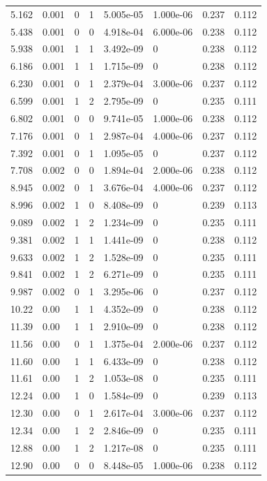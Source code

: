 \documentclass[preview]{standalone}
\begin{document}
{{\begin{tabular}{L{1.2cm}C{1.2cm} C{0.3cm}C{0.5cm} C{1.4cm}C{1.4cm} C{1.4cm}C{1.4cm}}
  5.162  &  0.001  & 0     &  1 &  5.005e-05  & 1.000e-06  & 0.237 &  0.112   \\ 
  5.438  &  0.001  & 0     &  0 &  4.918e-04  & 6.000e-06  & 0.238 &  0.112   \\ 
  5.938  &  0.001  & 1     &  1 &  3.492e-09  & 0  & 0.238 &  0.112   \\ 
  6.186  &  0.001  & 1     &  1 &  1.715e-09  & 0  & 0.238 &  0.112   \\ 
  6.230  &  0.001  & 0     &  1 &  2.379e-04  & 3.000e-06  & 0.237 &  0.112   \\ 
  6.599  &  0.001  & 1     &  2 &  2.795e-09  & 0  & 0.235 &  0.111   \\ 
  6.802  &  0.001  & 0     &  0 &  9.741e-05  & 1.000e-06  & 0.238 &  0.112   \\ 
  7.176  &  0.001  & 0     &  1 &  2.987e-04  & 4.000e-06  & 0.237 &  0.112   \\ 
  7.392  &  0.001  & 0     &  1 &  1.095e-05  & 0  & 0.237 &  0.112   \\ 
  7.708  &  0.002  & 0     &  0 &  1.894e-04  & 2.000e-06  & 0.238 &  0.112   \\ 
  8.945  &  0.002  & 0     &  1 &  3.676e-04  & 4.000e-06  & 0.237 &  0.112   \\ 
  8.996  &  0.002  & 1     &  0 &  8.408e-09  & 0  & 0.239 &  0.113   \\ 
  9.089  &  0.002  & 1     &  2 &  1.234e-09  & 0  & 0.235 &  0.111   \\ 
  9.381  &  0.002  & 1     &  1 &  1.441e-09  & 0  & 0.238 &  0.112   \\ 
  9.633  &  0.002  & 1     &  2 &  1.528e-09  & 0  & 0.235 &  0.111   \\ 
  9.841  &  0.002  & 1     &  2 &  6.271e-09  & 0  & 0.235 &  0.111   \\ 
  9.987  &  0.002  & 0     &  1 &  3.295e-06  & 0  & 0.237 &  0.112   \\ 
  10.22  &  0.00  & 1     &  1 &  4.352e-09  & 0  & 0.238 &  0.112   \\ 
  11.39  &  0.00  & 1     &  1 &  2.910e-09  & 0  & 0.238 &  0.112   \\ 
  11.56  &  0.00  & 0     &  1 &  1.375e-04  & 2.000e-06  & 0.237 &  0.112   \\ 
  11.60  &  0.00  & 1     &  1 &  6.433e-09  & 0  & 0.238 &  0.112   \\ 
  11.61  &  0.00  & 1     &  2 &  1.053e-08  & 0  & 0.235 &  0.111   \\ 
  12.24  &  0.00  & 1     &  0 &  1.584e-09  & 0  & 0.239 &  0.113   \\ 
  12.30  &  0.00  & 0     &  1 &  2.617e-04  & 3.000e-06  & 0.237 &  0.112   \\ 
  12.34  &  0.00  & 1     &  2 &  2.846e-09  & 0  & 0.235 &  0.111   \\ 
  12.88  &  0.00  & 1     &  2 &  1.217e-08  & 0  & 0.235 &  0.111   \\ 
  12.90  &  0.00  & 0     &  0 &  8.448e-05  & 1.000e-06  & 0.238 &  0.112   \\ 
\hline 
\end{tabular} 

}}
\end{document}
